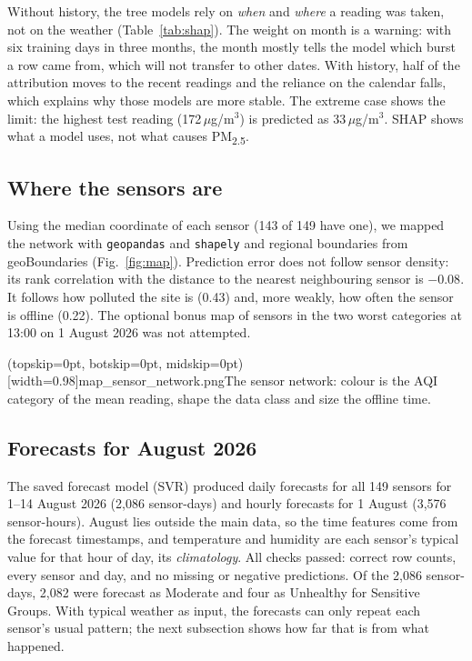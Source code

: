 \documentclass{ieeeaccess}
\newcommand{\ugm}{\,$\mu$g/m$^{3}$}
\newcommand{\pmtwo}{PM\textsubscript{2.5}}
\begin{document}
Without history, the tree models rely on \emph{when} and \emph{where} a reading was taken, not on the weather (Table~\ref{tab:shap}). The weight on month is a warning: with six training days in three months, the month mostly tells the model which burst a row came from, which will not transfer to other dates. With history, half of the attribution moves to the recent readings and the reliance on the calendar falls, which explains why those models are more stable. The extreme case shows the limit: the highest test reading (172\ugm) is predicted as 33\ugm{}. SHAP shows what a model uses, not what causes \pmtwo{}.

\subsection{Where the sensors are}
Using the median coordinate of each sensor (143 of 149 have one), we mapped the network with \texttt{geopandas} and \texttt{shapely} and regional boundaries from geoBoundaries (Fig.~\ref{fig:map}). Prediction error does not follow sensor density: its rank correlation with the distance to the nearest neighbouring sensor is $-0.08$. It follows how polluted the site is (0.43) and, more weakly, how often the sensor is offline (0.22). The optional bonus map of sensors in the two worst categories at 13:00 on 1 August 2026 was not attempted.

\Figure[t!](topskip=0pt, botskip=0pt, midskip=0pt)[width=0.98\columnwidth]{map_sensor_network.png}{The sensor network: colour is the AQI category of the mean reading, shape the data class and size the offline time.\label{fig:map}}

\subsection{Forecasts for August 2026}
The saved forecast model (SVR) produced daily forecasts for all 149 sensors for 1--14 August 2026 (2{,}086 sensor-days) and hourly forecasts for 1 August (3{,}576 sensor-hours). August lies outside the main data, so the time features come from the forecast timestamps, and temperature and humidity are each sensor's typical value for that hour of day, its \emph{climatology}. All checks passed: correct row counts, every sensor and day, and no missing or negative predictions. Of the 2{,}086 sensor-days, 2{,}082 were forecast as Moderate and four as Unhealthy for Sensitive Groups. With typical weather as input, the forecasts can only repeat each sensor's usual pattern; the next subsection shows how far that is from what happened.
\end{document}
